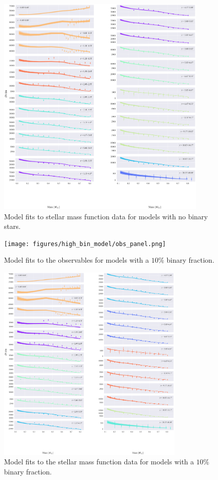 \begin{figure}
	\begin{center}
		\includegraphics[width=0.9\textwidth]{figures/prev_nobin/mass_fun.png}
	\end{center}
	\caption{Model fits to stellar mass function data for models with no binary stars.}
	\label{fig:nobin_mass_fun}
\end{figure}


\begin{figure}
	\centering
	\texttt{[image: figures/high\_bin\_model/obs\_panel.png]}
	\caption{Model fits to the observables for models with a $10\%$ binary fraction.}
	\label{fig:highbin_obs_panel}
\end{figure}


\begin{figure}
	\centering
	\includegraphics[width=0.8\textwidth]{figures/high_bin_model/mass_fun.png}
	\caption{Model fits to the stellar mass function data for models with a $10\%$ binary fraction.}
	\label{fig:highbin_mass_fun}
\end{figure}